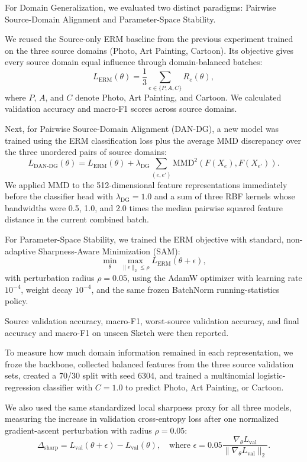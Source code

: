 \documentclass{article}
\begin{document}
For Domain Generalization, we evaluated two distinct paradigms: Pairwise Source-Domain Alignment and Parameter-Space Stability.

We reused the Source-only ERM baseline from the previous experiment trained on the three source domains (Photo, Art Painting, Cartoon). Its objective gives every source domain equal influence through domain-balanced batches:
\begin{equation}
L_{\text{ERM}}(\theta) = \frac{1}{3} \sum_{e \in \{P, A, C\}} R_e(\theta),
\end{equation}
where $P$, $A$, and $C$ denote Photo, Art Painting, and Cartoon. We calculated validation accuracy and macro-F1 scores across source domains.

Next, for Pairwise Source-Domain Alignment (DAN-DG), a new model was trained using the ERM classification loss plus the average MMD discrepancy over the three unordered pairs of source domains:
\begin{equation}
L_{\text{DAN-DG}}(\theta) = L_{\text{ERM}}(\theta) + \lambda_{\text{DG}} \sum_{(e, e')} \text{MMD}^2(F(X_e), F(X_{e'})).
\end{equation}
We applied MMD to the 512-dimensional feature representations immediately before the classifier head with $\lambda_{\text{DG}} = 1.0$ and a sum of three RBF kernels whose bandwidths were 0.5, 1.0, and 2.0 times the median pairwise squared feature distance in the current combined batch.

For Parameter-Space Stability, we trained the ERM objective with standard, non-adaptive Sharpness-Aware Minimization (SAM):
\begin{equation}
\min_\theta \max_{\|\epsilon\|_2 \le \rho} L_{\text{ERM}}(\theta + \epsilon),
\end{equation}
with perturbation radius $\rho = 0.05$, using the AdamW optimizer with learning rate $10^{-4}$, weight decay $10^{-4}$, and the same frozen BatchNorm running-statistics policy.

Source validation accuracy, macro-F1, worst-source validation accuracy, and final accuracy and macro-F1 on unseen Sketch were then reported.

To measure how much domain information remained in each representation, we froze the backbone, collected balanced features from the three source validation sets, created a 70/30 split with seed 6304, and trained a multinomial logistic-regression classifier with $C = 1.0$ to predict Photo, Art Painting, or Cartoon. 

We also used the same standardized local sharpness proxy for all three models, measuring the increase in validation cross-entropy loss after one normalized gradient-ascent perturbation with radius $\rho = 0.05$:
\begin{equation}
\Delta_{\text{sharp}} = L_{\text{val}}(\theta + \epsilon) - L_{\text{val}}(\theta), \quad \text{where } \epsilon = 0.05 \frac{\nabla_\theta L_{\text{val}}}{\|\nabla_\theta L_{\text{val}}\|_2}.
\end{equation}
\end{document}
